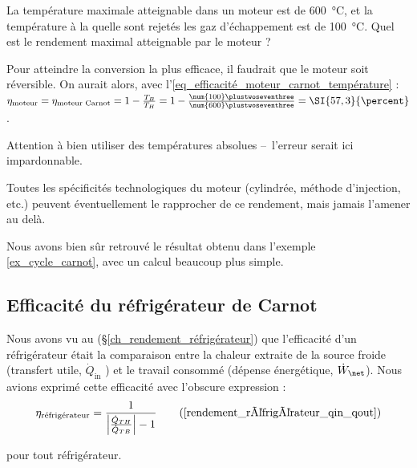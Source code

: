 		\begin{anexample}
		\label{ex_efficacite_moteur_carnot}
			La température maximale atteignable dans un moteur est de \SI{600}{\degreeCelsius}, et la température à la quelle sont rejetés les gaz d’échappement est de \SI{100}{\degreeCelsius}. Quel est le rendement maximal atteignable par le moteur ?
				\begin{answer}
					Pour atteindre la conversion la plus efficace, il faudrait que le moteur soit réversible. On aurait alors, avec l’\cref{eq_efficacité_moteur_carnot_température} : $\eta_\text{moteur} = \eta_\text{moteur Carnot} = 1 - \frac{T_B}{T_H} = 1 - \frac{\num{100}\plustwoseventhree}{\num{600}\plustwoseventhree} = \SI{57,3}{\percent}$.
					\begin{remark}Attention à bien utiliser des températures absolues --\ l’erreur serait ici impardonnable.\end{remark}
					\begin{remark}Toutes les spécificités technologiques du moteur (cylindrée, méthode d’injection, etc.) peuvent éventuellement le rapprocher de ce rendement, mais jamais l’amener au delà.\end{remark}
					\begin{remark}Nous avons bien sûr retrouvé le résultat obtenu dans l’exemple \ref{ex_cycle_carnot}, avec un calcul beaucoup plus simple.\end{remark}
				\end{answer}
		\end{anexample}


	\subsection{Efficacité du réfrigérateur de Carnot}

		Nous avons vu au (\S\ref{ch_rendement_réfrigérateur}) que l’efficacité d’un réfrigérateur était la comparaison entre la chaleur extraite de la source froide (transfert utile, $\dot Q_\text{in}$ ) et le travail consommé (dépense énergétique, $\dot W_\net$).  Nous avions exprimé cette efficacité avec l’obscure expression :
		\begin{equation}
			\eta_\text{réfrigérateur} = \frac{1}{ \left| \frac{\dot Q_{TH}}{\dot Q_{TB}} \right| - 1} \tag{\ref{rendement_réfrigérateur_qin_qout}}
		\end{equation}
		\begin{equationterms}
			\item pour tout réfrigérateur.
		\end{equationterms}

